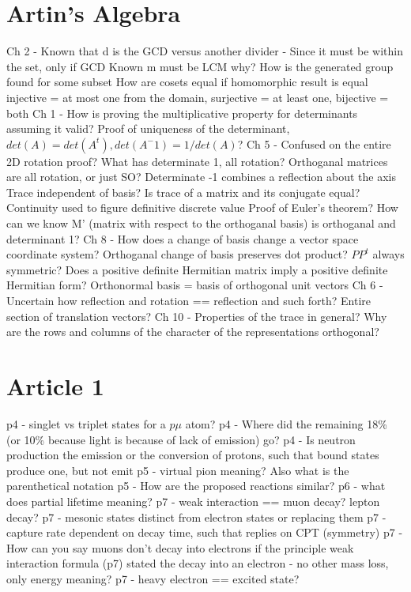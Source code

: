 \documentclass[11 pt, twoside]{article}
\newenvironment{outline*}
{
	\begin{outline}[enumerate]
	}
	{\end{outline}
}
\begin{document}
\section{Artin's Algebra}
\begin{outline*}
\1 Ch 2 - Known that d is the GCD versus another divider - Since it must be within the set, only if GCD
	 \2 Known m must be LCM why?
	 \2 How is the generated group found for some subset
	 \2 How are cosets equal if homomorphic result is equal
	 \2 injective = at most one from the domain, surjective = at least one, bijective = both
\1 Ch 1 - How is proving the multiplicative property for determinants assuming it valid?
	 \2 Proof of uniqueness of the determinant, $det(A) = det(A^t), det(A^-1) = 1/det(A)$?
\1 Ch 5 - Confused on the entire 2D rotation proof? What has determinate 1, all rotation?
	 \2 Orthoganal matrices are all rotation, or just SO? 
	 \2 Determinate -1 combines a reflection about the axis
	 \2 Trace independent of basis? Is trace of a matrix and its conjugate equal?
	 \2 Continuity used to figure definitive discrete value
	 \2 Proof of Euler's theorem? How can we know M' (matrix with respect to the orthoganal basis) is orthoganal and determinant 1?
\1 Ch 8 - How does a change of basis change a vector space coordinate system? Orthoganal change of basis preserves dot product?
	 \2 $PP^t$ always symmetric?
	 \2 Does a positive definite Hermitian matrix imply a positive definite Hermitian form?
	 \2 Orthonormal basis = basis of orthogonal unit vectors
\1 Ch 6 - Uncertain how reflection and rotation == reflection and such forth?
	 \2 Entire section of translation vectors?
\1 Ch 10 - Properties of the trace in general?
	  \2 Why are the rows and columns of the character of the representations orthogonal?
\end{outline*}

\section{Article 1}
\begin{outline*}
\1 p4 - singlet vs triplet states for a $p\mu$ atom?
\1 p4 - Where did the remaining 18\% (or 10\% because light is because of lack of emission) go?
\1 p4 - Is neutron production the emission or the conversion of protons, such that bound states produce one, but not emit
\1 p5 - virtual pion meaning? Also what is the parenthetical notation
\1 p5 - How are the proposed reactions similar?
\1 p6 - what does partial lifetime meaning?
\1 p7 - weak interaction == muon decay? lepton decay?
\1 p7 - mesonic states distinct from electron states or replacing them
\1 p7 - capture rate dependent on decay time, such that replies on CPT (symmetry)
\1 p7 - How can you say muons don't decay into electrons if the principle weak interaction formula (p7) stated the decay into an electron - no other mass loss, only energy meaning?
\1 p7 - heavy electron == excited state?
\end{outline*}
\end{document}

